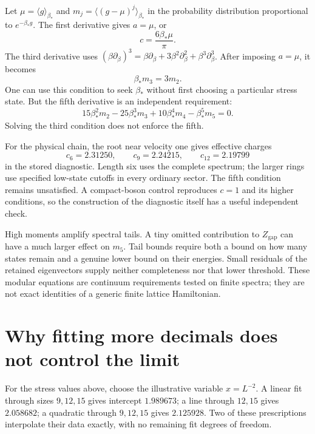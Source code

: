 Let $\mu=\langle g\rangle_{\beta_*}$ and
$m_j=\langle(g-\mu)^j\rangle_{\beta_*}$ in the probability distribution
proportional to $e^{-\beta_*g}$. The first derivative gives $a=\mu$,
or
\begin{equation}
 c=\frac{6\beta_*\mu}{\pi}.
 \label{eq:thermal-modular-c}
\end{equation}
The third derivative uses
$(\beta\partial_\beta)^3=
\beta\partial_\beta+3\beta^2\partial_\beta^2+
\beta^3\partial_\beta^3$.
After imposing $a=\mu$, it becomes
\begin{equation}
 \beta_*m_3=3m_2.
 \label{eq:thermal-modular-third}
\end{equation}
One can use this condition to seek $\beta_*$ without first choosing a
particular stress state. But the fifth derivative is an independent
requirement:
\[
 15\beta_*^2m_2-25\beta_*^3m_3+10\beta_*^4m_4-\beta_*^5m_5=0.
\]
Solving the third condition does not enforce the fifth.

For the physical chain, the root near velocity one gives effective
charges
\[
 c_6=2.31250,\qquad c_9=2.24215,\qquad c_{12}=2.19799
\]
in the stored diagnostic. Length six uses the complete spectrum; the
larger rings use specified low-state cutoffs in every ordinary
sector. The fifth condition remains unsatisfied. A compact-boson
control reproduces $c=1$ and its higher conditions, so the
construction of the diagnostic itself has a useful independent
check.

High moments amplify spectral tails. A tiny omitted contribution
to $Z_{\mathrm{gap}}$ can have a much larger effect on $m_5$.
Tail bounds require both a bound on how many states remain and a
genuine lower bound on their energies. Small residuals of the
retained eigenvectors supply neither completeness nor that lower
threshold. These modular equations are continuum requirements
tested on finite spectra; they are not exact identities of a
generic finite lattice Hamiltonian.

\section{Why fitting more decimals does not control the limit}

For the stress values above, choose the illustrative variable $x=L^{-2}$.
A linear fit through sizes $9,12,15$ gives intercept $1.989673$; a line
through $12,15$ gives $2.058682$; a quadratic through $9,12,15$ gives
$2.125928$. Two of these prescriptions interpolate their data exactly,
with no remaining fit degrees of freedom.

